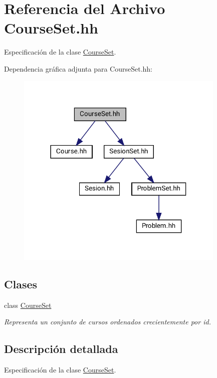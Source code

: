 \hypertarget{_course_set_8hh}{}\section{Referencia del Archivo Course\+Set.\+hh}
\label{_course_set_8hh}


Especificación de la clase \mbox{\hyperlink{class_course_set}{Course\+Set}}.  


Dependencia gráfica adjunta para Course\+Set.\+hh\+:\nopagebreak
\begin{figure}[H]
\begin{center}
\leavevmode
\includegraphics[width=283pt]{_course_set_8hh__incl}
\end{center}
\end{figure}
\subsection*{Clases}
\begin{DoxyCompactItemize}
\item 
class \mbox{\hyperlink{class_course_set}{Course\+Set}}
\begin{DoxyCompactList}\small\item\em Representa un conjunto de cursos ordenados crecientemente por id. \end{DoxyCompactList}\end{DoxyCompactItemize}


\subsection{Descripción detallada}
Especificación de la clase \mbox{\hyperlink{class_course_set}{Course\+Set}}. 

